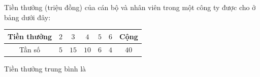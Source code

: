 \begin{ex}
Tiền thưởng (triệu đồng) của cán bộ và nhân viên trong một công ty được cho ở bảng dưới đây:
\begin{center}
\begin{tabular}{|c|c|c|c|c|c|c|}\hline
Tiền thưởng & $2$ & $3$ & $4$ & $5$ & $6$ & Cộng\\\hline
Tần số & $5$ & $15$ & $10$ & $6$ & $4$ & $40$\\\hline
\end{tabular}
\end{center}
Tiền thưởng trung bình là
\end{ex}
